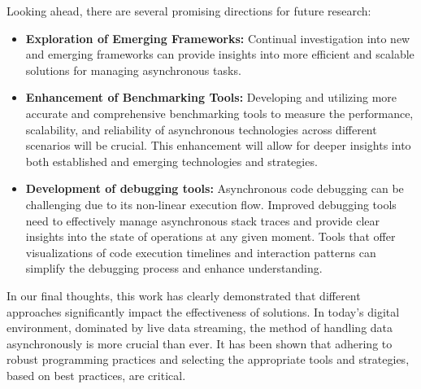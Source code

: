 Looking ahead, there are several promising directions for future research:

\begin{itemize}
    \item \textbf{Exploration of Emerging Frameworks:} Continual investigation into new and emerging frameworks can provide insights into more efficient and scalable solutions for managing asynchronous tasks.
    \item \textbf{Enhancement of Benchmarking Tools:} Developing and utilizing more accurate and comprehensive benchmarking tools to measure the performance, scalability, and reliability of asynchronous technologies across different scenarios will be crucial. This enhancement will allow for deeper insights into both established and emerging technologies and strategies.
    \item \textbf{Development of debugging tools:} Asynchronous code debugging can be challenging due to its non-linear execution flow. Improved debugging tools need to effectively manage asynchronous stack traces and provide clear insights into the state of operations at any given moment. Tools that offer visualizations of code execution timelines and interaction patterns can simplify the debugging process and enhance understanding.
\end{itemize}

    In our final thoughts, this work has clearly demonstrated that different approaches significantly impact the effectiveness of solutions. In today's digital environment, dominated by live data streaming, the method of handling data asynchronously is more crucial than ever. It has been shown that adhering to robust programming practices and selecting the appropriate tools and strategies, based on best practices, are critical.


